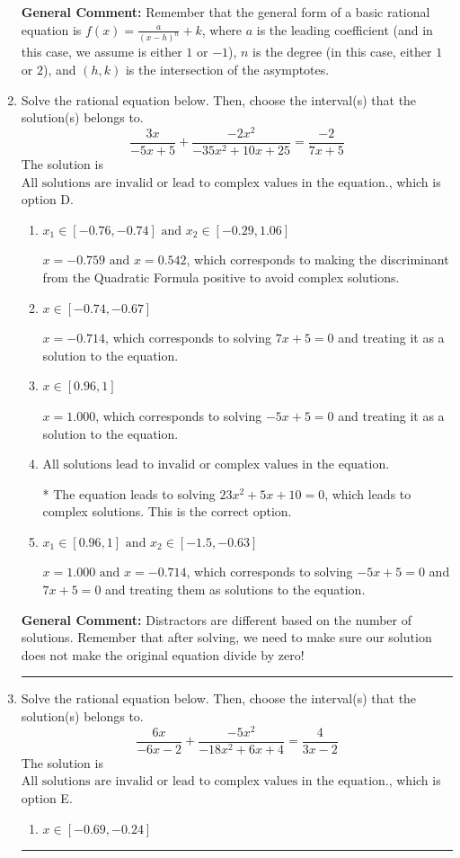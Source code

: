 \documentclass{extbook}[14pt]
\newcommand{\litem}[1]{\item #1

\rule{\textwidth}{0.4pt}}
\begin{document}
\begin{enumerate}
{\textbf{General Comment:} Remember that the general form of a basic rational equation is $ f(x) = \frac{a}{(x-h)^n} + k$, where $a$ is the leading coefficient (and in this case, we assume is either $1$ or $-1$), $n$ is the degree (in this case, either $1$ or $2$), and $(h, k)$ is the intersection of the asymptotes.
}
\litem{
Solve the rational equation below. Then, choose the interval(s) that the solution(s) belongs to.
\[ \frac{3x}{-5x + 5} + \frac{-2x^{2}}{-35x^{2} +10 x + 25} = \frac{-2}{7x + 5} \]The solution is \( \text{All solutions are invalid or lead to complex values in the equation.} \), which is option D.\begin{enumerate}[label=\Alph*.]
\item \( x_1 \in [-0.76, -0.74] \text{ and } x_2 \in [-0.29,1.06] \)

$x = -0.759 \text{ and } x = 0.542$, which corresponds to making the discriminant from the Quadratic Formula positive to avoid complex solutions.
\item \( x \in [-0.74,-0.67] \)

$x = -0.714$, which corresponds to solving $7x + 5 = 0$ and treating it as a solution to the equation.
\item \( x \in [0.96,1] \)

$x = 1.000$, which corresponds to solving $-5x + 5 = 0$ and treating it as a solution to the equation.
\item \( \text{All solutions lead to invalid or complex values in the equation.} \)

* The equation leads to solving $23x^{2} +5 x + 10=0$, which leads to complex solutions. This is the correct option.
\item \( x_1 \in [0.96, 1] \text{ and } x_2 \in [-1.5,-0.63] \)

$x = 1.000 \text{ and } x = -0.714$, which corresponds to solving $-5x + 5 = 0$ and $7x + 5 = 0$ and treating them as solutions to the equation.
\end{enumerate}

\textbf{General Comment:} Distractors are different based on the number of solutions. Remember that after solving, we need to make sure our solution does not make the original equation divide by zero!
}
\litem{
Solve the rational equation below. Then, choose the interval(s) that the solution(s) belongs to.
\[ \frac{6x}{-6x -2} + \frac{-5x^{2}}{-18x^{2} +6 x + 4} = \frac{4}{3x -2} \]The solution is \( \text{All solutions are invalid or lead to complex values in the equation.} \), which is option E.\begin{enumerate}[label=\Alph*.]
\item \( x \in [-0.69,-0.24] \)


\end{enumerate}}
\end{enumerate}
\end{document}
